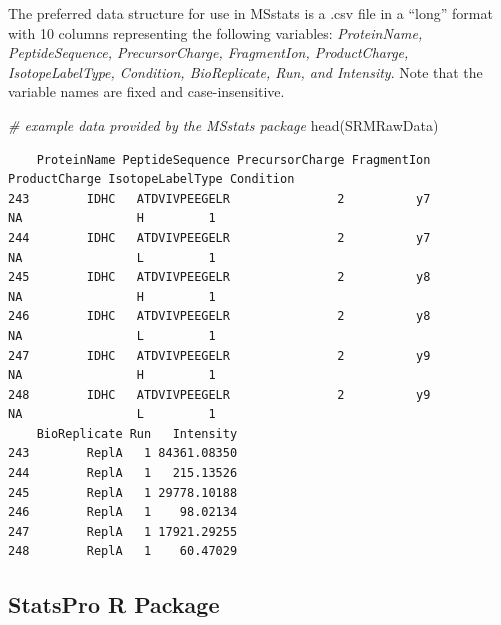 \documentclass[
]{book}
\newenvironment{Shaded}{\begin{snugshade}}{\end{snugshade}}
\newcommand{\CommentTok}[1]{\textcolor[rgb]{0.56,0.35,0.01}{\textit{#1}}}
\newcommand{\FunctionTok}[1]{\textcolor[rgb]{0.00,0.00,0.00}{#1}}
\newcommand{\NormalTok}[1]{#1}
\begin{document}
The preferred data structure for use in MSstats is a .csv file in a ``long'' format with 10 columns representing the following variables: \emph{ProteinName, PeptideSequence, PrecursorCharge, FragmentIon, ProductCharge, IsotopeLabelType, Condition, BioReplicate, Run, and Intensity}. Note that the variable names are fixed and case-insensitive.

\begin{Shaded}
\begin{Highlighting}[]
\CommentTok{\# example data provided by the MSstats package}
\FunctionTok{head}\NormalTok{(SRMRawData)}
\end{Highlighting}
\end{Shaded}

\begin{verbatim}
    ProteinName PeptideSequence PrecursorCharge FragmentIon ProductCharge IsotopeLabelType Condition
243        IDHC   ATDVIVPEEGELR               2          y7            NA                H         1
244        IDHC   ATDVIVPEEGELR               2          y7            NA                L         1
245        IDHC   ATDVIVPEEGELR               2          y8            NA                H         1
246        IDHC   ATDVIVPEEGELR               2          y8            NA                L         1
247        IDHC   ATDVIVPEEGELR               2          y9            NA                H         1
248        IDHC   ATDVIVPEEGELR               2          y9            NA                L         1
    BioReplicate Run   Intensity
243        ReplA   1 84361.08350
244        ReplA   1   215.13526
245        ReplA   1 29778.10188
246        ReplA   1    98.02134
247        ReplA   1 17921.29255
248        ReplA   1    60.47029
\end{verbatim}

\hypertarget{statspro-r-package}{%
\subsection*{StatsPro R Package}\label{statspro-r-package}}

\hfill\break
\end{document}

